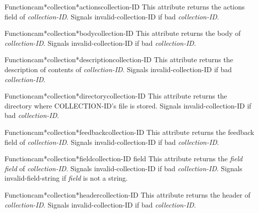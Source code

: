 \begin{functiondoc}{Function}{cam*collection*actions}{collection-ID}
This attribute returns the actions field of {\em collection-ID}.
Signals invalid-collection-ID if bad {\em collection-ID}.
\end{functiondoc}

\begin{functiondoc}{Function}{cam*collection*body}{collection-ID}
This attribute returns the body of {\em collection-ID}.
Signals invalid-collection-ID if bad {\em collection-ID}.
\end{functiondoc}

\begin{functiondoc}{Function}{cam*collection*description}{collection-ID}
This attribute returns the description of contents of {\em collection-ID}.
Signals invalid-collection-ID if bad {\em collection-ID}.
\end{functiondoc}

\begin{functiondoc}{Function}{cam*collection*directory}{collection-ID}
This attribute returns the directory where COLLECTION-ID's file is stored.
Signals invalid-collection-ID if bad {\em collection-ID}.
\end{functiondoc}

\begin{functiondoc}{Function}{cam*collection*feedback}{collection-ID}
This attribute returns the feedback field of {\em collection-ID}.
Signals invalid-collection-ID if bad {\em collection-ID}.
\end{functiondoc}

\begin{functiondoc}{Function}{cam*collection*field}{collection-ID field}
This attribute returns the {\em field} {\em field} of {\em collection-ID}.
Signals invalid-collection-ID if bad {\em collection-ID}.
Signals invalid-field-string if {\em field} is not a string.
\end{functiondoc}

\begin{functiondoc}{Function}{cam*collection*header}{collection-ID}
This attribute returns the header of {\em collection-ID}.
Signals invalid-collection-ID if bad {\em collection-ID}.
\end{functiondoc}

